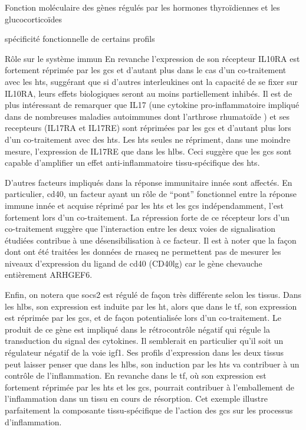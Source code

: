 \documentclass[../main.tex]{subfiles}
\begin{document}
\begin{chapter}{Fonction moléculaire des gènes régulés par les hormones thyroïdiennes et les glucocorticoïdes}
\begin{section}{spécificité fonctionnelle de certains profils}
\begin{subsection}{Rôle sur le système immun}
En revanche l'expression de son récepteur IL10RA est fortement réprimée par les \glspl{gc} et d'autant plus dans le cas d'un co-traitement avec les \glspl{ht}, suggérant que si d'autres interleukines ont la capacité de se fixer sur IL10RA, leurs effets biologiques seront au moins partiellement inhibés.
Il est de plus intéressant de remarquer que IL17 (une cytokine pro-inflammatoire impliqué dans de nombreuses maladies autoimmunes dont l'arthrose rhumatoïde \citealp{Onishi2010}) et ses recepteurs (IL17RA et IL17RE) sont réprimées par les \glspl{gc} et d'autant plus lors d'un co-traitement avec des \glspl{ht}.
Les \glspl{ht} seules ne répriment, dans une moindre mesure, l'expression de IL17RE que dans les \glspl{hlb}.
Ceci suggère que les \glspl{gc} sont capable d'amplifier un effet anti-inflammatoire tissu-spécifique des \glspl{ht}.
\par
D'autres facteurs impliqués dans la réponse immunitaire innée sont affectés.
En particulier, \gls{cd40}, un facteur ayant un rôle de ``pont'' fonctionnel entre la réponse immune innée et acquise \citep{Elgueta2009,Fujii2004} réprimé par les \glspl{ht} et les \glspl{gc} indépendamment, l'est fortement lors d'un co-traitement.
La répression forte de ce récepteur lors d'un co-traitement suggère que l'interaction entre les deux voies de signalisation étudiées contribue à une désensibilisation à ce facteur.
Il est à noter que la façon dont ont été traitées les données de \gls{rnaseq} ne permettent pas de mesurer les niveaux d'expression du ligand de \gls{cd40} (CD40lg) car le gène chevauche entièrement ARHGEF6.
\par
Enfin, on notera que \gls{socs2} est régulé de façon très différente selon les tissus.
Dans les \glspl{hlb}, son expression est induite par les \gls{ht}, alors que dans le \gls{tf}, son expression est réprimée par les \glspl{gc}, et de façon potentialisée lors d'un co-traitement.
Le produit de ce gène est impliqué dans le rétrocontrôle négatif qui régule la transduction du signal des cytokines.
Il semblerait en particulier qu'il soit un régulateur négatif de la voie \gls{igf}1.
Ses profils d'expression dans les deux tissus peut laisser penser que dans les \glspl{hlb}, son induction par les \glspl{ht} va contribuer à un contrôle de l'inflammation.
En revanche dans le \gls{tf}, où son expression est fortement réprimée par les \glspl{ht} et les \glspl{gc}, pourrait contribuer à l'emballement de l'inflammation dans un tissu en cours de résorption.
Cet exemple illustre parfaitement la composante tissu-spécifique de l'action des \glspl{gc} sur les processus d'inflammation.
\end{subsection}



\end{section}
\end{chapter}
\end{document}
